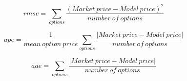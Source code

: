  \begin{equation}
    rmse = \sum_{options} \frac{(Market \ price - Model \ price)^2}{number \ of \ options} 
    \label{eq:rmse}
\end{equation}

   

 \begin{equation}
    ape =  \frac{1}{mean \ option \ price}   \sum_{options} \frac{|Market \ price - Model \ price|}{number \ of \ options}
    \label{eq:ape}
\end{equation}

 \begin{equation}
    aae =  \sum_{options} \frac{|Market \ price - Model \ price|}{number \ of \ options}
    \label{eq:ape}
\end{equation}